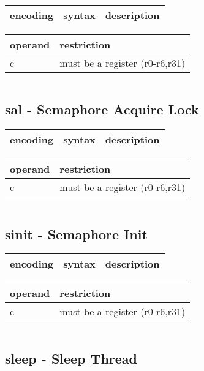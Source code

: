 \documentclass[letterpaper,10pt,openright,twoside,onecolumn]{book}
\begin{document}
  \begin{tabular}{|l|l|l|}
   \hline
    encoding & syntax & description \\
   \hline
   \hline
  \end{tabular}
  \flushleft
  \begin{tabular}{|l|l|}
   \hline
    operand & restriction \\
   \hline
    c & must be a register (r0-r6,r31) \\
   \hline
  \end{tabular}
  \begin{verbatim}
  \end{verbatim}
\newpage\subsection{sal - Semaphore Acquire Lock}
  \begin{tabular}{|l|l|l|}
   \hline
    encoding & syntax & description \\
   \hline
   \hline
  \end{tabular}
  \flushleft
  \begin{tabular}{|l|l|}
   \hline
    operand & restriction \\
   \hline
    c & must be a register (r0-r6,r31) \\
   \hline
  \end{tabular}
  \begin{verbatim}
  \end{verbatim}
\newpage\subsection{sinit - Semaphore Init}
  \begin{tabular}{|l|l|l|}
   \hline
    encoding & syntax & description \\
   \hline
   \hline
  \end{tabular}
  \flushleft
  \begin{tabular}{|l|l|}
   \hline
    operand & restriction \\
   \hline
    c & must be a register (r0-r6,r31) \\
   \hline
  \end{tabular}
  \begin{verbatim}
  \end{verbatim}
\newpage\subsection{sleep - Sleep Thread}
\end{document}
